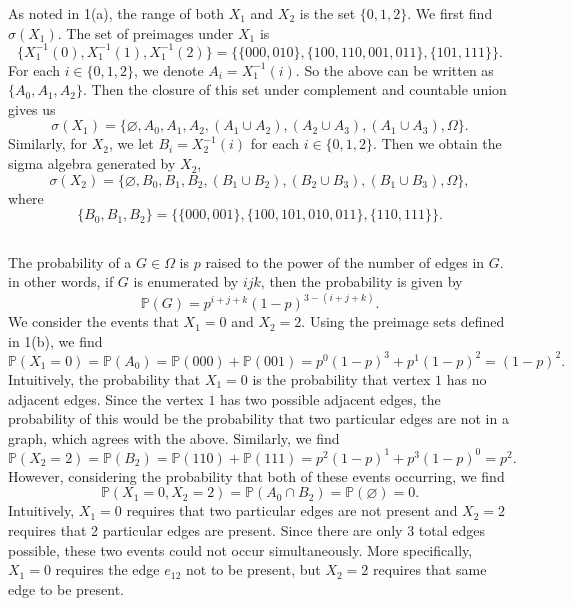 \documentclass[12pt]{article}
\renewcommand{\emptyset}{\varnothing}
\renewcommand{\P}{\mathbb{P}}
\begin{document}
As noted in 1(a), the range of both $X_1$ and $X_2$ is the set $\{0, 1, 2\}$. We first find $\sigma(X_1)$. The set of preimages under $X_1$ is
\[
    \{X_1^{-1}(0), X_1^{-1}(1), X_1^{-1}(2)\} = \{\{000, 010\}, \{100, 110, 001, 011\}, \{101, 111\}\}.
\]
For each $i \in \{0, 1, 2\}$, we denote $A_i = X_1^{-1}(i)$. So the above can be written as $\{A_0, A_1, A_2\}$. Then the closure of this set under complement and countable union gives us
\[
    \sigma(X_1) = \{\emptyset, A_0, A_1, A_2, (A_1 \cup A_2), (A_2 \cup A_3), (A_1 \cup A_3), \Omega\}.
\]
Similarly, for $X_2$, we let $B_i = X_2^{-1}(i)$ for each $i \in \{0, 1, 2\}$. Then we obtain the sigma algebra generated by $X_2$,
\[
    \sigma(X_2) = \{\emptyset, B_0, B_1, B_2, (B_1 \cup B_2), (B_2 \cup B_3), (B_1 \cup B_3), \Omega\},
\]
where
\[
    \{B_0, B_1, B_2\} = \{\{000, 001\}, \{100, 101, 010, 011\}, \{110, 111\}\}.
\]

\subsection{}

The probability of a $G \in \Omega$ is $p$ raised to the power of the number of edges in $G$. in other words, if $G$ is enumerated by $ijk$, then the probability is given by
\[
    \P(G) = p^{i + j + k}(1 - p)^{3 - (i + j + k)}.
\]
We consider the events that $X_1 = 0$ and $X_2 = 2$. Using the preimage sets defined in 1(b), we find
\[
    \P(X_1 = 0) = \P(A_0) = \P(000) + \P(001) = p^0(1-p)^3 + p^1(1-p)^2 = (1 - p)^2.
\]
Intuitively, the probability that $X_1 = 0$ is the probability that vertex $1$ has no adjacent edges. Since the vertex $1$ has two possible adjacent edges, the probability of this would be the probability that two particular edges are not in a graph, which agrees with the above. Similarly, we find
\[
    \P(X_2 = 2) = \P(B_2) = \P(110) + \P(111) = p^2(1-p)^1 + p^3(1-p)^0 = p^2.
\]
However, considering the probability that both of these events occurring, we find
\[
    \P(X_1 = 0, X_2 = 2) = \P(A_0 \cap B_2) = \P(\emptyset) = 0.
\]
Intuitively, $X_1 = 0$ requires that two particular edges are not present and $X_2 = 2$ requires that 2 particular edges are present. Since there are only $3$ total edges possible, these two events could not occur simultaneously. More specifically, $X_1 = 0$ requires the edge $e_{12}$ not to be present, but $X_2 = 2$ requires that same edge to be present.

\subsection{}
\end{document}
